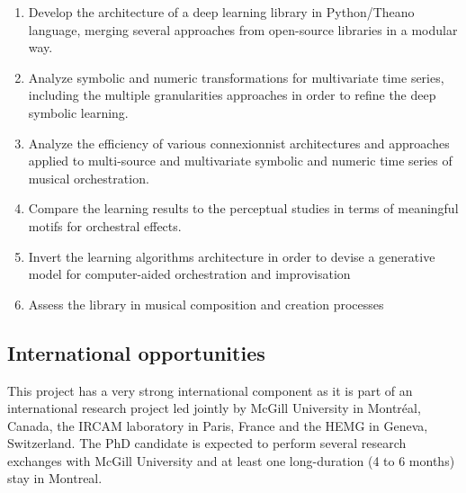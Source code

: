 \documentclass[10pt]{article}
\begin{document}
\begin{enumerate}
\item Develop the architecture of a deep learning library in Python/Theano language, merging several approaches from open-source libraries in a modular way.
\item Analyze symbolic and numeric transformations for multivariate time series, including the multiple granularities approaches in order to refine the deep symbolic learning.
\item Analyze the efficiency of various connexionnist architectures and approaches applied to multi-source and multivariate symbolic and numeric time series of musical orchestration.
\item Compare the learning results to the perceptual studies in terms of meaningful motifs for orchestral effects.
\item Invert the learning algorithms architecture in order to devise a generative model for computer-aided orchestration and improvisation
\item Assess the library in musical composition and creation processes
\end{enumerate}

\noindent\makebox[\linewidth]{\rule{\textwidth}{2pt}} 
\subsection*{International opportunities}
\noindent\makebox[\linewidth]{\rule{\textwidth}{2pt}} 

This project has a very strong international component as it is part of an international research project led jointly by McGill University in Montr\'{e}al, Canada, the IRCAM laboratory in Paris, France and the HEMG in Geneva, Switzerland. The PhD candidate is expected to perform several research exchanges with McGill University and at least one long-duration (4 to 6 months) stay in Montreal.


 
\end{document}
